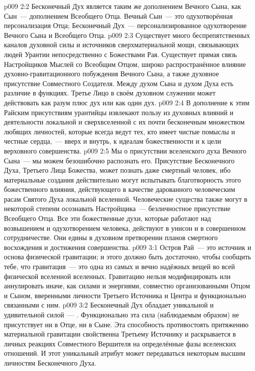 \vs p009 2:2 Бесконечный Дух является таким же дополнением Вечного Сына, как Сын~--- дополнением Всеобщего Отца. Вечный Сын~--- это одухотворённая персонализация Отца; Бесконечный Дух~--- персонализированное одухотворение Вечного Сына и Всеобщего Отца.
\vs p009 2:3 Существует много беспрепятственных каналов духовной силы и источников сверхматериальной мощи, связывающих людей Урантии непосредственно с Божествами Рая. Существует прямая связь Настройщиков Мыслей со Всеобщим Отцом, широко распространённое влияние духовно\hyp{}гравитационного побуждения Вечного Сына, а также духовное присутствие Совместного Создателя. Между духом Сына и духом Духа есть различие в функциях. Третье Лицо в своём духовном служении может действовать как разум плюс дух или как один дух.
\vs p009 2:4 В дополнение к этим Райским присутствиям урантийцы извлекают пользу из духовных влияний и деятельности локальной и сверхвселенной с их почти бесконечным множеством любящих личностей, которые всегда ведут тех, кто имеет чистые помыслы и честные сердца,~--- вверх и внутрь, к идеалам божественности и к цели верховного совершенства.
\vs p009 2:5 Мы  о присутствии вселенского духа Вечного Сына~--- мы можем безошибочно распознать его. Присутствие Бесконечного Духа, Третьего Лица Божества, может познать даже смертный человек, ибо материальные создания действительно могут испытывать благотворность этого божественного влияния, действующего в качестве дарованного человеческим расам Святого Духа локальной вселенной. Человеческие существа также могут в некоторой степени осознавать Настройщика~--- безличностное присутствие Всеобщего Отца. Все эти божественные духи, которые работают над возвышением и одухотворением человека, действуют в унисон и в совершенном сотрудничестве. Они едины в духовном претворении планов смертного восхождения и достижения совершенства.
\vs p009 3:1 Остров Рай~--- это источник и основа физической гравитации; и этого должно быть достаточно, чтобы сообщить тебе, что гравитация~--- это одна из самых  и вечно надёжных вещей во всей физической вселенной вселенных. Гравитацию нельзя модифицировать или аннулировать иначе, как силами и энергиями, совместно организованными Отцом и Сыном, вверенными личности Третьего Источника и Центра и функционально связанными с ним.
\vs p009 3:2 \pc Бесконечный Дух обладает уникальной и удивительной силой~--- . Функционально эта сила (наблюдаемым образом) не присутствует ни в Отце, ни в Сыне. Эта способность противостоять притяжению материальной гравитации свойственна Третьему Источнику и раскрывается в личных реакциях Совместного Вершителя на определённые фазы вселенских отношений. И этот уникальный атрибут может передаваться некоторым высшим личностям Бесконечного Духа.
